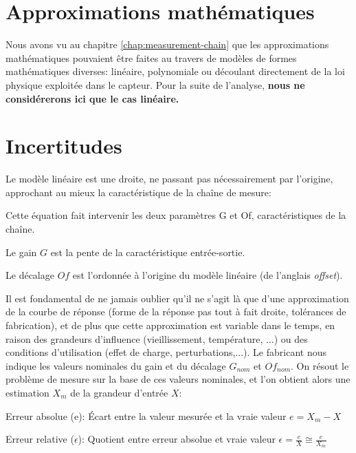 \documentclass[main.tex]{subfiles}
\begin{document}
\section{Approximations mathématiques}

Nous avons vu au chapitre \ref{chap:measurement-chain} que les approximations mathématiques pouvaient être faites au travers de modèles de formes mathématiques diverses: linéaire, polynomiale ou découlant directement de la loi physique exploitée dans le capteur. Pour la suite de l'analyse, \textbf{nous ne considérerons ici que le cas linéaire.}

\section{Incertitudes}

Le modèle linéaire est une droite, ne passant pas nécessairement par l'origine, approchant au mieux la caractéristique de la chaîne de mesure:

\begin{center}
\end{center}

Cette équation fait intervenir les deux paramètres G et Of, caractéristiques de la chaîne.

\begin{definition}
    Le gain $G$ est la pente de la caractéristique entrée-sortie.
\end{definition}

\begin{definition}
    Le décalage $Of$ est l'ordonnée à l'origine du modèle linéaire (de l'anglais \emph{offset}).
\end{definition}

Il est fondamental de ne jamais oublier qu'il ne s'agit là que d'une approximation de la courbe de réponse (forme de la réponse pas tout à fait droite, tolérances de fabrication), et de plus que cette approximation est variable dans le temps, en raison des grandeurs d'influence (vieillissement, température, ...) ou des conditions d'utilisation (effet de charge, perturbations,...). Le fabricant nous indique les valeurs nominales du gain et du décalage $G_{nom}$ et $Of_{nom}$.
On résout le problème de mesure sur la base de ces valeurs nominales, et l'on obtient alors une estimation $X_{m}$ de la grandeur d'entrée $X$:

\begin{definition}
    Erreur absolue (e): Écart entre la valeur mesurée et la vraie valeur 	$e = X_{m} - X$
\end{definition}
\begin{definition}
    Erreur relative ($\epsilon$): Quotient entre erreur absolue et vraie valeur  $\epsilon = \frac{e}{X}  \cong \frac{e}{X_{m}}$
\end{definition}
\end{document}
